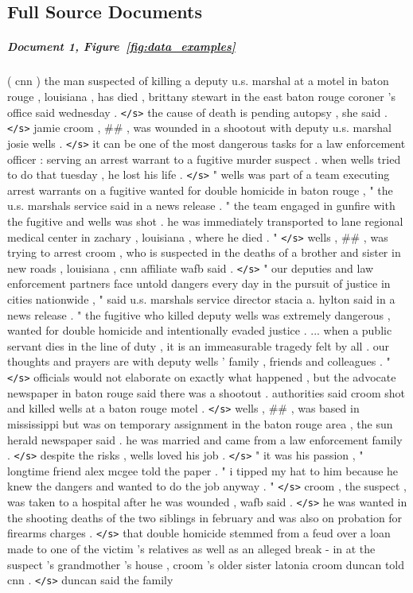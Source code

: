 \documentclass[12pt]{report}
\begin{document}
\begin{appendices}


\chapter{Full Source Documents}
\label{appendix:full_docs}

\paragraph{Document 1, Figure~\ref{fig:data_examples}} ( cnn ) the man suspected of killing a deputy u.s. marshal at a motel in baton rouge , louisiana , has died , brittany stewart in the east baton rouge coroner 's office said wednesday . \texttt{</s>} the cause of death is pending autopsy , she said . \texttt{</s>} jamie croom , \#\# , was wounded in a shootout with deputy u.s. marshal josie wells . \texttt{</s>} it can be one of the most dangerous tasks for a law enforcement officer : serving an arrest warrant to a fugitive murder suspect . when wells tried to do that tuesday , he lost his life . \texttt{</s>} " wells was part of a team executing arrest warrants on a fugitive wanted for double homicide in baton rouge , " the u.s. marshals service said in a news release . " the team engaged in gunfire with the fugitive and wells was shot . he was immediately transported to lane regional medical center in zachary , louisiana , where he died . " \texttt{</s>} wells , \#\# , was trying to arrest croom , who is suspected in the deaths of a brother and sister in new roads , louisiana , cnn affiliate wafb said . \texttt{</s>} " our deputies and law enforcement partners face untold dangers every day in the pursuit of justice in cities nationwide , " said u.s. marshals service director stacia a. hylton said in a news release . " the fugitive who killed deputy wells was extremely dangerous , wanted for double homicide and intentionally evaded justice . ... when a public servant dies in the line of duty , it is an immeasurable tragedy felt by all . our thoughts and prayers are with deputy wells ' family , friends and colleagues . " \texttt{</s>} officials would not elaborate on exactly what happened , but the advocate newspaper in baton rouge said there was a shootout . authorities said croom shot and killed wells at a baton rouge motel . \texttt{</s>} wells , \#\# , was based in mississippi but was on temporary assignment in the baton rouge area , the sun herald newspaper said . he was married and came from a law enforcement family . \texttt{</s>} despite the risks , wells loved his job . \texttt{</s>} " it was his passion , " longtime friend alex mcgee told the paper . " i tipped my hat to him because he knew the dangers and wanted to do the job anyway . " \texttt{</s>} croom , the suspect , was taken to a hospital after he was wounded , wafb said . \texttt{</s>} he was wanted in the shooting deaths of the two siblings in february and was also on probation for firearms charges . \texttt{</s>} that double homicide stemmed from a feud over a loan made to one of the victim 's relatives as well as an alleged break - in at the suspect 's grandmother 's house , croom 's older sister latonia croom duncan told cnn . \texttt{</s>} duncan said the family 
\end{appendices}
\end{document}

